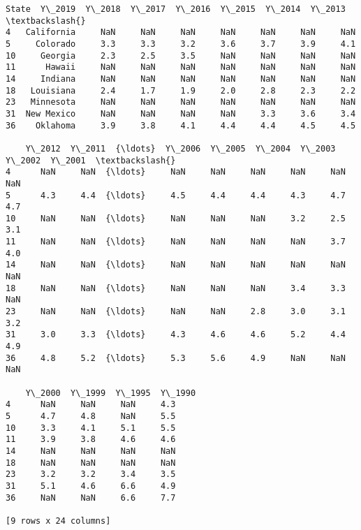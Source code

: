 \documentclass[11pt]{article}
\makeatletter
\newcommand{\boxspacing}{\kern\kvtcb@left@rule\kern\kvtcb@boxsep}
\newcommand{\prompt}[4]{
        {\ttfamily\llap{{\color{#2}[#3]:\hspace{3pt}#4}}\vspace{-\baselineskip}}
    }
\makeatother
\begin{document}
            \begin{tcolorbox}[breakable, size=fbox, boxrule=.5pt, pad at break*=1mm, opacityfill=0]
\prompt{Out}{outcolor}{24}{\boxspacing}
\begin{Verbatim}[commandchars=\\\{\}]
         State  Y\_2019  Y\_2018  Y\_2017  Y\_2016  Y\_2015  Y\_2014  Y\_2013  \textbackslash{}
4   California     NaN     NaN     NaN     NaN     NaN     NaN     NaN
5     Colorado     3.3     3.3     3.2     3.6     3.7     3.9     4.1
10     Georgia     2.3     2.5     3.5     NaN     NaN     NaN     NaN
11      Hawaii     NaN     NaN     NaN     NaN     NaN     NaN     NaN
14     Indiana     NaN     NaN     NaN     NaN     NaN     NaN     NaN
18   Louisiana     2.4     1.7     1.9     2.0     2.8     2.3     2.2
23   Minnesota     NaN     NaN     NaN     NaN     NaN     NaN     NaN
31  New Mexico     NaN     NaN     NaN     NaN     3.3     3.6     3.4
36    Oklahoma     3.9     3.8     4.1     4.4     4.4     4.5     4.5

    Y\_2012  Y\_2011  {\ldots}  Y\_2006  Y\_2005  Y\_2004  Y\_2003  Y\_2002  Y\_2001  \textbackslash{}
4      NaN     NaN  {\ldots}     NaN     NaN     NaN     NaN     NaN     NaN
5      4.3     4.4  {\ldots}     4.5     4.4     4.4     4.3     4.7     4.7
10     NaN     NaN  {\ldots}     NaN     NaN     NaN     3.2     2.5     3.1
11     NaN     NaN  {\ldots}     NaN     NaN     NaN     NaN     3.7     4.0
14     NaN     NaN  {\ldots}     NaN     NaN     NaN     NaN     NaN     NaN
18     NaN     NaN  {\ldots}     NaN     NaN     NaN     3.4     3.3     NaN
23     NaN     NaN  {\ldots}     NaN     NaN     2.8     3.0     3.1     3.2
31     3.0     3.3  {\ldots}     4.3     4.6     4.6     5.2     4.4     4.9
36     4.8     5.2  {\ldots}     5.3     5.6     4.9     NaN     NaN     NaN

    Y\_2000  Y\_1999  Y\_1995  Y\_1990
4      NaN     NaN     NaN     4.3
5      4.7     4.8     NaN     5.5
10     3.3     4.1     5.1     5.5
11     3.9     3.8     4.6     4.6
14     NaN     NaN     NaN     NaN
18     NaN     NaN     NaN     NaN
23     3.2     3.2     3.4     3.5
31     5.1     4.6     6.6     4.9
36     NaN     NaN     6.6     7.7

[9 rows x 24 columns]
\end{Verbatim}
\end{tcolorbox}
        
\end{document}
